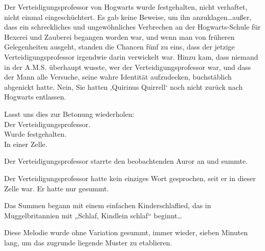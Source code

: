 Der Verteidigungsprofessor von Hogwarts wurde festgehalten, nicht verhaftet, nicht einmal eingeschüchtert. Es gab keine Beweise, um ihn anzuklagen…außer, dass ein schreckliches und ungewöhnliches Verbrechen an der Hogwarts-Schule für Hexerei und Zauberei begangen worden war, und wenn man von früheren Gelegenheiten ausgeht, standen die Chancen fünf zu eins, dass der jetzige Verteidigungsprofessor irgendwie darin verwickelt war. Hinzu kam, dass niemand in der A.M.S. überhaupt wusste, wer der Verteidigungsprofessor war, und dass der Mann alle Versuche, seine wahre Identität aufzudecken, buchstäblich abgenickt hatte.
Nein, Sie hatten ‚Quirinus Quirrell‘ noch nicht zurück nach Hogwarts entlassen.




Lasst uns dies zur Betonung wiederholen:\\
Der Verteidigungsprofessor.\\
Wurde festgehalten.\\
In einer Zelle.

Der Verteidigungsprofessor starrte den beobachtenden Auror an und summte.

Der Verteidigungsprofessor hatte kein einziges Wort gesprochen, seit er in dieser Zelle war. Er hatte nur gesummt.

Das Summen begann mit einem einfachen Kinderschlaflied, das in Muggelbritannien mit „Schlaf, Kindlein schlaf“ beginnt…

Diese Melodie wurde ohne Variation gesummt, immer wieder, sieben Minuten lang, um das zugrunde liegende Muster zu etablieren.

